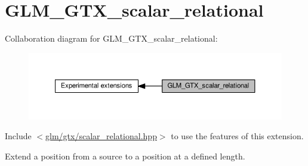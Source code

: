 \hypertarget{group__gtx__scalar__relational}{}\section{G\+L\+M\+\_\+\+G\+T\+X\+\_\+scalar\+\_\+relational}
\label{group__gtx__scalar__relational}
Collaboration diagram for G\+L\+M\+\_\+\+G\+T\+X\+\_\+scalar\+\_\+relational\+:
\nopagebreak
\begin{figure}[H]
\begin{center}
\leavevmode
\includegraphics[width=350pt]{d3/d49/group__gtx__scalar__relational}
\end{center}
\end{figure}
Include $<$\hyperlink{scalar__relational_8hpp}{glm/gtx/scalar\+\_\+relational.\+hpp}$>$ to use the features of this extension.

Extend a position from a source to a position at a defined length. 